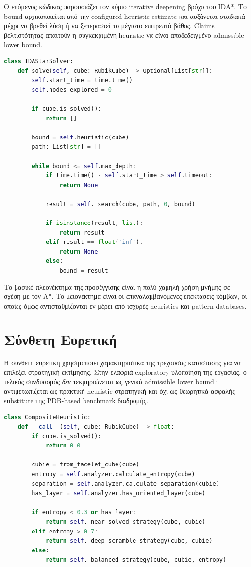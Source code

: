 Ο επόμενος κώδικας παρουσιάζει τον κύριο iterative deepening βρόχο του IDA*. Το bound αρχικοποιείται από την configured heuristic estimate και αυξάνεται σταδιακά μέχρι να βρεθεί λύση ή να ξεπεραστεί το μέγιστο επιτρεπτό βάθος. Claims βελτιστότητας απαιτούν η συγκεκριμένη heuristic να είναι αποδεδειγμένο admissible lower bound.

\begin{lstlisting}[language=Python, caption={Κύριος βρόχος του IDA* solver}, label={lst:idastar_loop}]
class IDAStarSolver:
    def solve(self, cube: RubikCube) -> Optional[List[str]]:
        self.start_time = time.time()
        self.nodes_explored = 0

        if cube.is_solved():
            return []

        bound = self.heuristic(cube)
        path: List[str] = []

        while bound <= self.max_depth:
            if time.time() - self.start_time > self.timeout:
                return None

            result = self._search(cube, path, 0, bound)

            if isinstance(result, list):
                return result
            elif result == float('inf'):
                return None
            else:
                bound = result
\end{lstlisting}

Το βασικό πλεονέκτημα της προσέγγισης είναι η πολύ χαμηλή χρήση μνήμης σε σχέση με τον A*. Το μειονέκτημα είναι οι επαναλαμβανόμενες επεκτάσεις κόμβων, οι οποίες όμως αντισταθμίζονται εν μέρει από ισχυρές heuristics και pattern databases.

\section{Σύνθετη Ευρετική}

Η σύνθετη ευρετική χρησιμοποιεί χαρακτηριστικά της τρέχουσας κατάστασης για να επιλέξει στρατηγική εκτίμησης. Στην ελαφριά exploratory υλοποίηση της εργασίας, ο τελικός συνδυασμός \emph{δεν} τεκμηριώνεται ως γενικά admissible lower bound· αντιμετωπίζεται ως πρακτική heuristic στρατηγική και όχι ως θεωρητικά ασφαλής substitute της PDB-based benchmark διαδρομής.

\begin{lstlisting}[language=Python, caption={Δυναμική επιλογή στρατηγικής στη σύνθετη ευρετική}, label={lst:composite_heuristic}]
class CompositeHeuristic:
    def __call__(self, cube: RubikCube) -> float:
        if cube.is_solved():
            return 0.0

        cubie = from_facelet_cube(cube)
        entropy = self.analyzer.calculate_entropy(cube)
        separation = self.analyzer.calculate_separation(cubie)
        has_layer = self.analyzer.has_oriented_layer(cube)

        if entropy < 0.3 or has_layer:
            return self._near_solved_strategy(cube, cubie)
        elif entropy > 0.7:
            return self._deep_scramble_strategy(cube, cubie)
        else:
            return self._balanced_strategy(cube, cubie, entropy)
\end{lstlisting}

